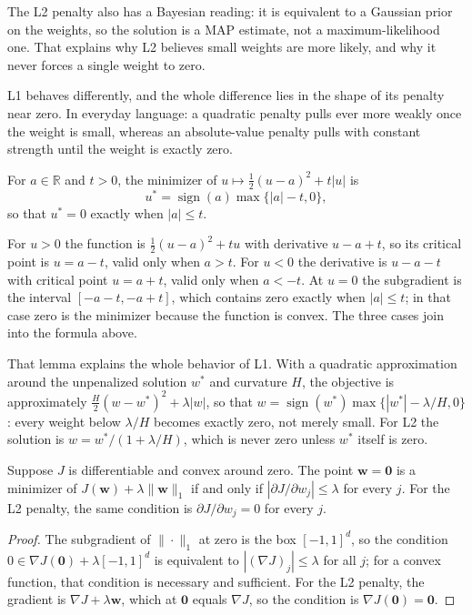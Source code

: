 The L2 penalty also has a Bayesian reading: it is equivalent to a Gaussian prior on
the weights, so the solution is a MAP estimate, not a maximum-likelihood one. That
explains why L2 believes small weights are more likely, and why it never forces a
single weight to zero.

L1 behaves differently, and the whole difference lies in the shape of its penalty
near zero. In everyday language: a quadratic penalty pulls ever more weakly once the
weight is small, whereas an absolute-value penalty pulls with constant strength
until the weight is exactly zero.

\begin{lemma}
For $a\in\mathbb{R}$ and $t>0$, the minimizer of $u\mapsto\frac12(u-a)^2+t|u|$ is
\[
u^\ast=\operatorname{sign}(a)\max\{|a|-t,0\},
\]
so that $u^\ast=0$ exactly when $|a|\le t$.
\end{lemma}

For $u>0$ the function is $\frac12(u-a)^2+tu$ with derivative $u-a+t$, so its
critical point is $u=a-t$, valid only when $a>t$. For $u<0$ the derivative is
$u-a-t$ with critical point $u=a+t$, valid only when $a<-t$. At $u=0$ the
subgradient is the interval $[-a-t,-a+t]$, which contains zero exactly when
$|a|\le t$; in that case zero is the minimizer because the function is convex. The
three cases join into the formula above.

That lemma explains the whole behavior of L1. With a quadratic approximation around
the unpenalized solution $w^\ast$ and curvature $H$, the objective is approximately
$\frac H2(w-w^\ast)^2+\lambda|w|$, so that
$w=\operatorname{sign}(w^\ast)\max\{|w^\ast|-\lambda/H,0\}$: every weight below
$\lambda/H$ becomes exactly zero, not merely small. For L2 the solution is
$w=w^\ast/(1+\lambda/H)$, which is never zero unless $w^\ast$ itself is zero.

\begin{proposisi}
Suppose $J$ is differentiable and convex around zero. The point $\mathbf{w}=\mathbf{0}$
is a minimizer of $J(\mathbf{w})+\lambda\|\mathbf{w}\|_1$ if and only if
$|\partial J/\partial w_j|\le\lambda$ for every $j$. For the L2 penalty, the same
condition is $\partial J/\partial w_j=0$ for every $j$.
\end{proposisi}

\begin{proof}[Proof]
The subgradient of $\|\cdot\|_1$ at zero is the box $[-1,1]^d$, so the condition
$0\in\nabla J(\mathbf{0})+\lambda[-1,1]^d$ is equivalent to $|(\nabla J)_j|\le\lambda$
for all $j$; for a convex function, that condition is necessary and sufficient. For
the L2 penalty, the gradient is $\nabla J+\lambda\mathbf{w}$, which at $\mathbf{0}$
equals $\nabla J$, so the condition is $\nabla J(\mathbf{0})=\mathbf{0}$.
\end{proof}

